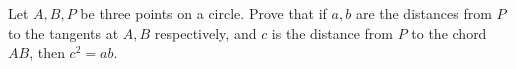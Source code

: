 Let $A,B,P$ be three points on a circle. Prove that if $a,b$ are the distances from $P$ to the tangents at $A,B$ respectively, and $c$ is the distance from $P$ to the chord $AB$,  then $c^2 =ab$.